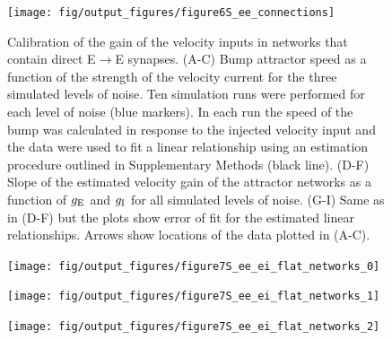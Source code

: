 \documentclass[a4paper,12pt]{article}
\newcommand{\ssc}[3]{\ensuremath{#1_{\text{#2}_{\text{#3}}}}}
\newcommand{\gE      }{\ssc{g}      {\scriptsize{E}}{}}
\newcommand{\gI      }{\ssc{g}      {\scriptsize{I}}{}}
\begin{document}
\clearpage

\begin{figure}[ht!]
    \internallinenumbers
    \centering
        \texttt{[image: fig/output\_figures/figure6S\_ee\_connections]}
    \caption{Calibration of the gain of the velocity inputs in networks that
    contain direct E$\rightarrow$E synapses. (A-C) Bump attractor speed as a
    function of the strength of the velocity current for the three simulated
    levels of noise. Ten simulation runs were performed for each level of noise
    (blue markers). In each run the speed of the bump was calculated in
    response to the injected velocity input and the data were used to fit a
    linear relationship using an estimation procedure outlined in Supplementary
    Methods (black line). (D-F) Slope of the estimated velocity gain of the
    attractor networks as a function of $\gE$ and $\gI$ for all simulated
    levels of noise. (G-I) Same as in (D-F) but the plots show error of fit for
    the estimated linear relationships. Arrows show locations of the data
    plotted in (A-C).}
\end{figure}

\clearpage

\begin{figure}[p!]
    \internallinenumbers
    \centering
        \texttt{[image: fig/output\_figures/figure7S\_ee\_ei\_flat\_networks\_0]}
\end{figure}

\clearpage

\begin{figure}[p!]
    \internallinenumbers
    \centering
        \texttt{[image: fig/output\_figures/figure7S\_ee\_ei\_flat\_networks\_1]}
\end{figure}

\begin{figure}[p!]
    \internallinenumbers
    \centering
        \texttt{[image: fig/output\_figures/figure7S\_ee\_ei\_flat\_networks\_2]}
\end{figure}

\clearpage
\end{document}
